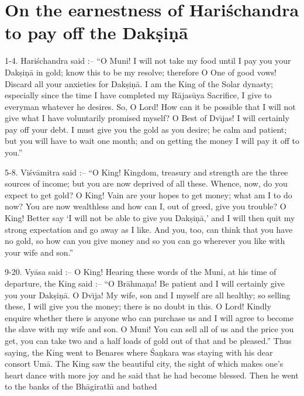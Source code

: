 \chapter{On the earnestness of Hari\'schandra to pay off the Dak\d{s}i\d{n}\=a}

1-4. Hari\'schandra said :-- ``O Muni! I will not take my food until I pay you your Dak\d{s}i\d{n}\=a in gold; know this to be my resolve; therefore O One of good vows! Discard all your anxieties for Dak\d{s}i\d{n}\=a. I am the King of the Solar dynasty; especially since the time I have completed my R\=ajas\=uya Sacrifice, I give to everyman whatever he desires. So, O Lord! How can it be possible that I will not give what I have voluntarily promised myself? O Best of Dv\={\i}jas! I will certainly pay off your debt. I must give you the gold as you desire; be calm and patient; but you will have to wait one month; and on getting the money I will pay it off to you.''

5-8. Vi\'sv\=amitra said :-- ``O King! Kingdom, treasury and strength are the three sources of income; but you are now deprived of all these. Whence, now, do you expect to get gold? O King! Vain are your hopes to get money; what am I to do now? You are now wealthless and how can I, out of greed, give you trouble? O King! Better say `I will not be able to give you Dak\d{s}i\d{n}\=a,' and I will then quit my strong expectation and go away as I like. And you, too, can think that you have no gold, so how can you give money and so you can go wherever you like with your wife and son.''

9-20. Vy\=asa said :-- O King! Hearing these words of the Muni, at his time of departure, the King said :-- ``O Br\=ahma\d{n}a! Be patient and I will certainly give you your Dak\d{s}i\d{n}\=a. O Dv\={\i}ja! My wife, son and I myself are all healthy; so selling these, I will give you the money; there is no doubt in this. O Lord! Kindly enquire whether there is anyone who can purchase us and I will agree to become the slave with my wife and son. O Muni! You can sell all of us and the price you get, you can take two and a half loads of gold out of that and be pleased.'' Thus saying, the King went to Benares where \'Sa\d{n}kara was staying with his dear consort Um\=a. The King saw the beautiful city, the sight of which makes one's heart dance with more joy and he said that he had become blessed. Then he went to the banks of the Bh\=agirath\={\i} and bathed

